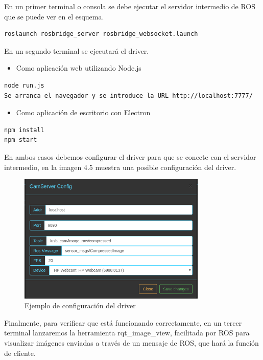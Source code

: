 En un primer terminal o consola se debe ejecutar el servidor intermedio de ROS que se puede ver en el esquema.
\begin{lstlisting}[caption= Ejecución del servidor intermedio, label=cod.servidorintermedio]
roslaunch rosbridge_server rosbridge_websocket.launch
\end{lstlisting}
En un segundo terminal se ejecutará el driver.
\begin{itemize}
\item 
Como aplicación web utilizando Node.js
\end{itemize}
\begin{lstlisting}[caption= Ejecución con Node.js, label=cod.nodejs]
node run.js
Se arranca el navegador y se introduce la URL http://localhost:7777/
\end{lstlisting}
\begin{itemize}
\item 
Como aplicación de escritorio con Electron
\end{itemize}
\begin{lstlisting}[caption= Ejecución con Electron, label=cod.electron]
npm install
npm start
\end{lstlisting}
En ambos casos debemos configurar el driver para que se conecte con el servidor intermedio, en la imagen 4.5 muestra una posible configuración del driver.
\begin{figure}[H]
  \begin{center}
    \includegraphics[width=0.8\textwidth]{figures/configcamservertest.png}
		\caption{Ejemplo de configuración del driver}
		\label{fig.esquemacamserver}
		\end{center}
\end{figure}
Finalmente, para verificar que está funcionando correctamente, en un tercer terminal lanzaremos la herramienta rqt\_image\_view, facilitada por ROS para visualizar imágenes enviadas a través de un mensaje de ROS, que hará la función de cliente.

